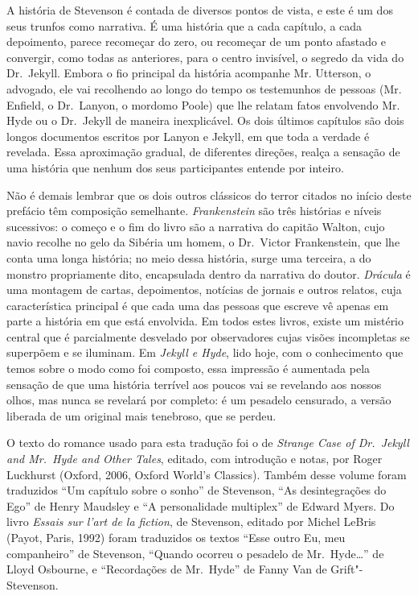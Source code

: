 A história de Stevenson é contada de diversos pontos de vista, e este é
um dos seus trunfos como narrativa.  É uma história que a cada
capítulo, a cada depoimento, parece recomeçar do zero, ou recomeçar de
um ponto afastado e convergir, como todas as anteriores, para o centro
invisível, o segredo da vida do Dr.~Jekyll.  Embora o fio principal da
história acompanhe Mr. Utterson, o advogado, ele vai recolhendo ao
longo do tempo os testemunhos de pessoas (Mr. Enfield, o Dr.~Lanyon, o
mordomo Poole) que lhe relatam fatos envolvendo Mr. Hyde ou o Dr.~Jekyll 
de maneira inexplicável. Os dois últimos capítulos são dois
longos documentos escritos por Lanyon e Jekyll, em que toda a verdade é
revelada.  Essa aproximação gradual, de diferentes direções, realça a
sensação de uma história que nenhum dos seus participantes entende por
inteiro.  

Não é demais lembrar que os dois outros clássicos do terror citados no
início deste prefácio têm composição semelhante.  \textit{Frankenstein}
são três histórias e níveis sucessivos: o começo e o fim do livro são a
narrativa do capitão Walton, cujo navio recolhe no gelo da Sibéria um
homem, o Dr.~Victor Frankenstein, que lhe conta uma longa história; no
meio dessa história, surge uma terceira, a do monstro propriamente
dito, encapsulada dentro da narrativa do doutor.  \textit{Drácula} é
uma montagem de cartas, depoimentos, notícias de jornais e outros
relatos, cuja característica principal é que cada uma das pessoas que
escreve vê apenas em parte a história em que está envolvida.  Em todos
estes livros, existe um mistério central que é parcialmente desvelado
por observadores cujas visões incompletas se superpõem e se iluminam. 
Em \textit{Jekyll e Hyde}, lido hoje, com o
conhecimento que temos sobre o modo como foi composto, essa impressão é
aumentada pela sensação de que uma história terrível aos poucos vai se
revelando aos nossos olhos, mas nunca se revelará por completo: é um
pesadelo censurado, a versão liberada de um original mais tenebroso,
que se perdeu.\linebreak


\noindent O texto do romance usado para esta tradução foi o de \textit{Strange Case 
of Dr.~Jekyll and Mr.~Hyde and Other Tales}, editado, com introdução 
e notas, por Roger Luckhurst (Oxford, 2006, Oxford World’s Classics). 
Também desse volume foram traduzidos “Um capítulo sobre o sonho” de 
Stevenson, “As desintegrações do Ego” de Henry Maudsley e “A personalidade 
multiplex” de Edward Myers.  Do livro \textit{Essais sur l’art de la fiction}, de 
Stevenson, editado por Michel LeBris (Payot, Paris, 1992) foram 
traduzidos os textos “Esse outro Eu, meu companheiro” de Stevenson, “Quando 
ocorreu o pesadelo de Mr.~Hyde\ldots{}” de Lloyd Osbourne, 
e “Recordações de Mr.~Hyde” de Fanny Van de Grift"-Stevenson.

